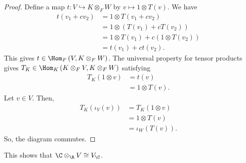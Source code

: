 \documentclass[10pt]{mypackage}
\begin{document}
  \begin{proof}
    Define a map $t: V\hookrightarrow K\otimes_{F}W$ by $v\mapsto 1\otimes T(v)$. We have
    \begin{align*}
      t\left(v_1 + cv_2\right) &= 1\otimes T\left(v_1 + cv_2\right)\\
                               &= 1\otimes \left(T\left(v_1\right) + cT\left(v_2\right)\right)\\
                               &= 1\otimes T\left(v_1\right) + c\left(1\otimes T\left(v_2\right)\right)\\
                               &= t\left(v_1\right) + ct\left(v_2\right).
    \end{align*}
    This gives $t\in \Hom_{F}\left(V,K\otimes_{F}W\right)$. The universal property for tensor products gives $T_K\in \Hom_{K}\left(K\otimes_{F}V,K\otimes_{F}W\right)$ satisfying
    \begin{align*}
      T_{K}\left(1\otimes v\right) &= t\left(v\right)\\
                                   &= 1\otimes T\left(v\right).
    \end{align*}
    Let $v\in V$. Then,
    \begin{align*}
      T_{K}\left(\iota_{V}\left(v\right)\right) &= T_{K}\left(1\otimes v\right)\\
                                                &= 1\otimes T\left(v\right)\\
                                                &= \iota_{W}\left(T(v)\right).
    \end{align*}
    So, the diagram commutes.
  \end{proof}
  \begin{remark}
    This shows that $\C\otimes_{\R}V \cong V_{\C}$.
  \end{remark}
\end{document}
